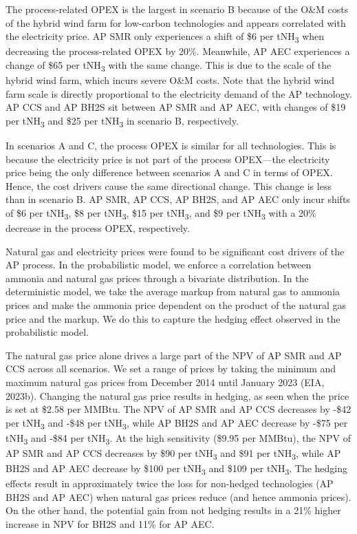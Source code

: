\documentclass{article}
\begin{document}
The process-related OPEX is the largest in scenario B because of the O\&M costs of the hybrid wind farm for low-carbon technologies and appears correlated with the electricity price. AP SMR only experiences a shift of \$6 per tNH\textsubscript{3} when decreasing the process-related OPEX by 20\%. Meanwhile, AP AEC experiences a change of \$65 per tNH\textsubscript{3} with the same change. This is due to the scale of the hybrid wind farm, which incurs severe O\&M costs. Note that the hybrid wind farm scale is directly proportional to the electricity demand of the AP technology. AP CCS and AP BH2S sit between AP SMR and AP AEC, with changes of \$19 per tNH\textsubscript{3} and \$25 per tNH\textsubscript{3} in scenario B, respectively.

In scenarios A and C, the process OPEX is similar for all technologies. This is because the electricity price is not part of the process OPEX—the electricity price being the only difference between scenarios A and C in terms of OPEX. Hence, the cost drivers cause the same directional change. This change is less than in scenario B. AP SMR, AP CCS, AP BH2S, and AP AEC only incur shifts of \$6 per tNH\textsubscript{3}, \$8 per tNH\textsubscript{3}, \$15 per tNH\textsubscript{3}, and \$9 per tNH\textsubscript{3} with a 20\% decrease in the process OPEX, respectively.

Natural gas and electricity prices were found to be significant cost drivers of the AP process. In the probabilistic model, we enforce a correlation between ammonia and natural gas prices through a bivariate distribution. In the deterministic model, we take the average markup from natural gas to ammonia prices and make the ammonia price dependent on the product of the natural gas price and the markup. We do this to capture the hedging effect observed in the probabilistic model.

The natural gas price alone drives a large part of the NPV of AP SMR and AP CCS across all scenarios. We set a range of prices by taking the minimum and maximum natural gas prices from December 2014 until January 2023 (EIA, 2023b). Changing the natural gas price results in hedging, as seen when the price is set at \$2.58 per MMBtu. The NPV of AP SMR and AP CCS decreases by -\$42 per tNH\textsubscript{3} and -\$48 per tNH\textsubscript{3}, while AP BH2S and AP AEC decrease by -\$75 per tNH\textsubscript{3} and -\$84 per tNH\textsubscript{3}. At the high sensitivity (\$9.95 per MMBtu), the NPV of AP SMR and AP CCS decreases by \$90 per tNH\textsubscript{3} and \$91 per tNH\textsubscript{3}, while AP BH2S and AP AEC decrease by \$100 per tNH\textsubscript{3} and \$109 per tNH\textsubscript{3}. The hedging effects result in approximately twice the loss for non-hedged technologies (AP BH2S and AP AEC) when natural gas prices reduce (and hence ammonia prices). On the other hand, the potential gain from not hedging results in a 21\% higher increase in NPV for BH2S and 11\% for AP AEC.
\end{document}
